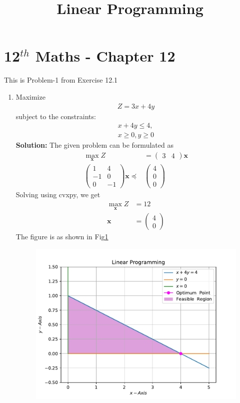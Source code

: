 \documentclass[12pt]{article}
\newcommand{\solution}{\noindent \textbf{Solution: }}
\newcommand{\myvec}[1]{\ensuremath{\begin{pmatrix}#1\end{pmatrix}}}
\let\vec\mathbf
\begin{document}
\begin{center}
\title{\textbf{Linear Programming}}
\date{\vspace{-5ex}} %
\maketitle
\end{center}
\setcounter{page}{1}

\section{12$^{th}$ Maths - Chapter 12}
This is Problem-1 from Exercise 12.1
\begin{enumerate}
\item Maximize
\begin{align}
	Z = 3x + 4y
\end{align}
subject to the constraints:
\begin{align}
	x+4y \leq 4, \\ 
	x \geq 0, y \geq 0
\end{align}
\solution 
The given problem can be formulated as 
\begin{align}
	\max_{\vec{x}} Z &= \myvec{3 & 4}\vec{x} \\
        \myvec{1 & 4\\
               -1 &0\\
	       0 & -1}\vec{x}\preceq & \myvec{4 \\0\\0}
\end{align}
Solving using cvxpy, we get
\begin{align}
	\max_{\vec{x}} Z &= 12 \\
	\vec{x} &= \myvec{4  \\  0} 
\end{align}
The figure is as shown in Fig\ref{fig:Fig1}
\begin{figure}[!h]
	\begin{center}
		\includegraphics[width=\columnwidth]{figs/problem1.pdf}
	\end{center}
\caption{}
\label{fig:Fig1}
\end{figure}
\end{enumerate}
\end{document}
